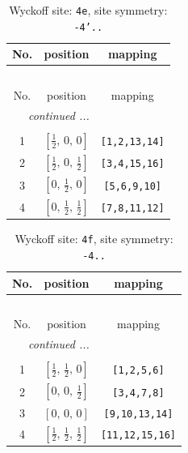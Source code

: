 \documentclass[fleqn,8pt]{jsarticle}
\begin{document}
\renewcommand{\arraystretch}{1.2}
\begin{longtable}{ccc}
\caption{Wyckoff site: {\tt 4e}, site symmetry: {\tt -4'..}}
 \\
 \hline \hline
No. & position & mapping \\ \hline \endfirsthead

\multicolumn{2}{l}{\tablename\ \thetable{}} \\
 \hline \hline
No. & position & mapping \\ \hline \endhead

 \hline \hline
\multicolumn{2}{r}{\footnotesize\it continued ...} \\ \endfoot

 \hline \hline
\multicolumn{2}{r}{} \\ \endlastfoot

1 & $\left[ \frac{1}{2},\, 0,\, 0 \right]$ & {\tt [1,2,13,14]} \\ \hline
2 & $\left[ \frac{1}{2},\, 0,\, \frac{1}{2} \right]$ & {\tt [3,4,15,16]} \\ \hline
3 & $\left[ 0,\, \frac{1}{2},\, 0 \right]$ & {\tt [5,6,9,10]} \\ \hline
4 & $\left[ 0,\, \frac{1}{2},\, \frac{1}{2} \right]$ & {\tt [7,8,11,12]} \\
\end{longtable}
\renewcommand{\arraystretch}{1.2}
\begin{longtable}{ccc}
\caption{Wyckoff site: {\tt 4f}, site symmetry: {\tt -4..}}
 \\
 \hline \hline
No. & position & mapping \\ \hline \endfirsthead

\multicolumn{2}{l}{\tablename\ \thetable{}} \\
 \hline \hline
No. & position & mapping \\ \hline \endhead

 \hline \hline
\multicolumn{2}{r}{\footnotesize\it continued ...} \\ \endfoot

 \hline \hline
\multicolumn{2}{r}{} \\ \endlastfoot

1 & $\left[ \frac{1}{2},\, \frac{1}{2},\, 0 \right]$ & {\tt [1,2,5,6]} \\ \hline
2 & $\left[ 0,\, 0,\, \frac{1}{2} \right]$ & {\tt [3,4,7,8]} \\ \hline
3 & $\left[ 0,\, 0,\, 0 \right]$ & {\tt [9,10,13,14]} \\ \hline
4 & $\left[ \frac{1}{2},\, \frac{1}{2},\, \frac{1}{2} \right]$ & {\tt [11,12,15,16]} \\
\end{longtable}
\end{document}
